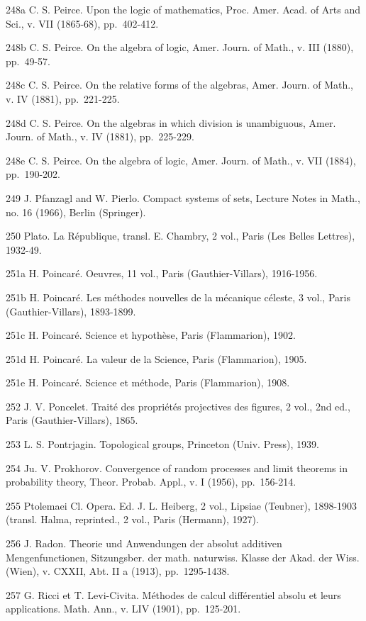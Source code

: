 248a C. S. Peirce. Upon the logic of mathematics, Proc. Amer. Acad. of Arts and Sci., v. VII (1865-68), pp.~402-412.

248b C. S. Peirce. On the algebra of logic, Amer. Journ. of Math., v. III (1880), pp.~49-57.

248c C. S. Peirce. On the relative forms of the algebras, Amer. Journ. of Math., v. IV (1881), pp.~221-225.

248d C. S. Peirce. On the algebras in which division is unambiguous, Amer. Journ. of Math., v. IV (1881), pp.~225-229.

248e C. S. Peirce. On the algebra of logic, Amer. Journ. of Math., v. VII (1884), pp.~190-202.

249 J. Pfanzagl and W. Pierlo. Compact systems of sets, Lecture Notes in Math., no. 16 (1966), Berlin (Springer).

250 Plato. La République, transl. E. Chambry, 2 vol., Paris (Les Belles Lettres), 1932-49.

251a H. Poincaré. Oeuvres, 11 vol., Paris (Gauthier-Villars), 1916-1956.

251b H. Poincaré. Les méthodes nouvelles de la mécanique céleste, 3 vol., Paris (Gauthier-Villars), 1893-1899.

251c H. Poincaré. Science et hypothèse, Paris (Flammarion), 1902.

251d H. Poincaré. La valeur de la Science, Paris (Flammarion), 1905.

251e H. Poincaré. Science et méthode, Paris (Flammarion), 1908.

252 J. V. Poncelet. Traité des propriétés projectives des figures, 2 vol., 2nd ed., Paris (Gauthier-Villars), 1865.

253 L. S. Pontrjagin. Topological groups, Princeton (Univ. Press), 1939.

254 Ju. V. Prokhorov. Convergence of random processes and limit theorems in probability theory, Theor. Probab. Appl., v. I (1956), pp.~156-214.

255 Ptolemaei Cl. Opera. Ed. J. L. Heiberg, 2 vol., Lipsiae (Teubner), 1898-1903 (transl. Halma, reprinted., 2 vol., Paris (Hermann), 1927).

256 J. Radon. Theorie und Anwendungen der absolut additiven Mengenfunctionen, Sitzungsber. der math. naturwiss. Klasse der Akad. der Wiss. (Wien), v. CXXII, Abt. II a (1913), pp.~1295-1438.

257 G. Ricci et T. Levi-Civita. Méthodes de calcul différentiel absolu et leurs applications. Math. Ann., v. LIV (1901), pp.~125-201.

